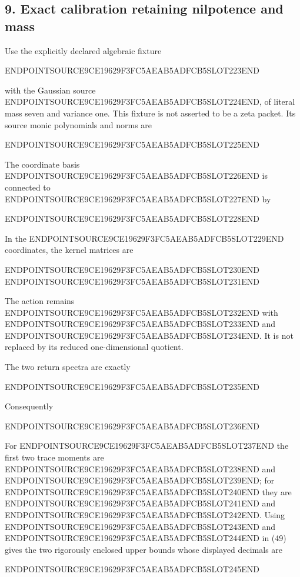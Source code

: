 \subsection{9. Exact calibration retaining nilpotence and mass}\label{endpoint-restriction_original--exact-calibration-retaining-nilpotence-and-mass}

Use the explicitly declared algebraic fixture

ENDPOINTSOURCE9CE19629F3FC5AEAB5ADFCB5SLOT223END

with the Gaussian source ENDPOINTSOURCE9CE19629F3FC5AEAB5ADFCB5SLOT224END, of literal mass seven and variance one. This fixture is not asserted to be a zeta packet. Its source monic polynomials and norms are

ENDPOINTSOURCE9CE19629F3FC5AEAB5ADFCB5SLOT225END

The coordinate basis ENDPOINTSOURCE9CE19629F3FC5AEAB5ADFCB5SLOT226END is connected to ENDPOINTSOURCE9CE19629F3FC5AEAB5ADFCB5SLOT227END by

ENDPOINTSOURCE9CE19629F3FC5AEAB5ADFCB5SLOT228END

In the ENDPOINTSOURCE9CE19629F3FC5AEAB5ADFCB5SLOT229END coordinates, the kernel matrices are

ENDPOINTSOURCE9CE19629F3FC5AEAB5ADFCB5SLOT230END ENDPOINTSOURCE9CE19629F3FC5AEAB5ADFCB5SLOT231END

The action remains ENDPOINTSOURCE9CE19629F3FC5AEAB5ADFCB5SLOT232END with ENDPOINTSOURCE9CE19629F3FC5AEAB5ADFCB5SLOT233END and ENDPOINTSOURCE9CE19629F3FC5AEAB5ADFCB5SLOT234END. It is not replaced by its reduced one-dimensional quotient.

The two return spectra are exactly

ENDPOINTSOURCE9CE19629F3FC5AEAB5ADFCB5SLOT235END

Consequently

ENDPOINTSOURCE9CE19629F3FC5AEAB5ADFCB5SLOT236END

For ENDPOINTSOURCE9CE19629F3FC5AEAB5ADFCB5SLOT237END the first two trace moments are ENDPOINTSOURCE9CE19629F3FC5AEAB5ADFCB5SLOT238END and ENDPOINTSOURCE9CE19629F3FC5AEAB5ADFCB5SLOT239END; for ENDPOINTSOURCE9CE19629F3FC5AEAB5ADFCB5SLOT240END they are ENDPOINTSOURCE9CE19629F3FC5AEAB5ADFCB5SLOT241END and ENDPOINTSOURCE9CE19629F3FC5AEAB5ADFCB5SLOT242END. Using ENDPOINTSOURCE9CE19629F3FC5AEAB5ADFCB5SLOT243END and ENDPOINTSOURCE9CE19629F3FC5AEAB5ADFCB5SLOT244END in (49) gives the two rigorously enclosed upper bounds whose displayed decimals are

ENDPOINTSOURCE9CE19629F3FC5AEAB5ADFCB5SLOT245END

